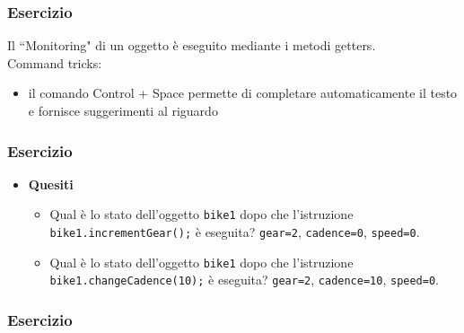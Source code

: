 \documentclass{article}
\theoremstyle{definition}
\begin{document}
\subsubsection{Esercizio}





Il ``Monitoring" di un oggetto \`e eseguito mediante i metodi getters.\\
Command tricks:
\begin{itemize}
\item il comando Control + Space permette di completare automaticamente il testo e fornisce suggerimenti al riguardo
\end{itemize}






\subsubsection{Esercizio}






\begin{itemize}
\item \textbf{Quesiti}
\begin{itemize}
\item Qual \`e lo stato dell'oggetto \texttt{bike1} dopo che l'istruzione \texttt{bike1.incrementGear();} \`e eseguita? 
\texttt{gear=2}, \texttt{cadence=0}, \texttt{speed=0}.
\item Qual \`e lo stato dell'oggetto  \texttt{bike1} dopo che l'istruzione \texttt{bike1.changeCadence(10);} \`e eseguita? 
\texttt{gear=2}, \texttt{cadence=10}, \texttt{speed=0}.
\end{itemize}
\end{itemize}

\subsubsection{Esercizio}
\end{document}
